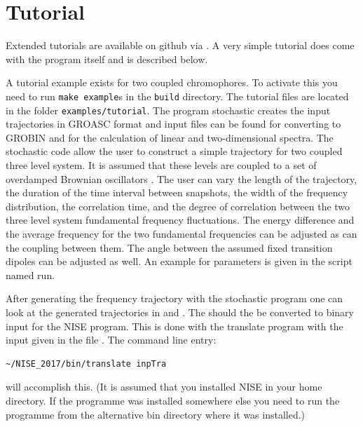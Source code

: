 \chapter{Tutorial}
Extended tutorials are available on github via
. A very simple tutorial does come
with the program itself and is described below.  

A tutorial example exists for two coupled chromophores. To activate this you need
to run {\tt make example}s in the {\tt build} directory. The tutorial files are
located in the folder {\tt examples/tutorial}. The program stochastic creates the
input  trajectories in GROASC format and input files can be found for converting to
GROBIN and for the calculation of linear and two-dimensional spectra. The stochastic
code allow the user to construct a simple trajectory for two coupled three level
system. It is assumed that these levels are coupled to a set of overdamped Brownian
oscillators \cite{Mukamel.1995.B01}.
The user can vary the length of the trajectory, the duration of the time interval
between snapshots, the  width of the frequency distribution, the correlation time,
and the degree of correlation between the two three level system fundamental frequency
fluctuations. The energy difference and the average frequency for the two fundamental
frequencies can be adjusted as can the coupling between them. The angle between the
assumed fixed transition dipoles can be adjusted as well. An example for parameters
is given in the script named run. 

After generating the frequency trajectory with the stochastic program one can look at
the generated trajectories in  and . The should the be
converted to binary input for the NISE program. This is done with the translate
program with the input given in the file . The command line entry:
\begin{lstlisting}[style=mystyle]
~/NISE_2017/bin/translate inpTra
\end{lstlisting}
will accomplish this. (It is assumed that you installed NISE in your home directory.
If the programme was installed somewhere else you need to run the programme from the
alternative bin directory where it was installed.)

